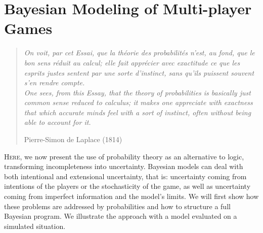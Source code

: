 \chapter{Bayesian Modeling of Multi-player Games}
\chaptertoc


\begin{quotation}\textit{
On voit, par cet Essai, que la théorie des probabilités n'est, au fond, que le bon sens réduit au calcul; elle fait apprécier avec exactitude ce que les esprits justes sentent par une sorte d'instinct, sans qu'ils puissent souvent s'en rendre compte.
\vspace{0.2cm} \\
One sees, from this Essay, that the theory of probabilities is basically just common sense reduced to calculus; it makes one appreciate with exactness that which accurate minds feel with a sort of instinct, often without being able to account for it.}
\begin{flushright}Pierre-Simon de Laplace (1814)\end{flushright}\end{quotation}

\lettrine{H}{ere}, we now present the use of probability theory as an alternative to logic, transforming incompleteness into uncertainty. Bayesian models can deal with both intentional and extensional uncertainty, that is: uncertainty coming from intentions of the players or the stochasticity of the game, as well as uncertainty coming from imperfect information and the model's limits. We will first show how these problems are addressed by probabilities and how to structure a full Bayesian program. We illustrate the approach with a model evaluated on a simulated  situation.


